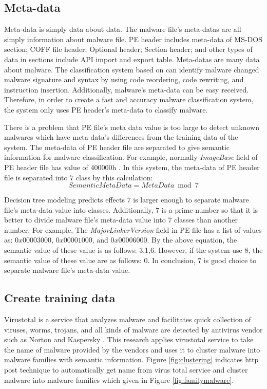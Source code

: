 \subsection{Meta-data}
Meta-data is simply data about data. The malware file's meta-datas are all simply information about malware file. PE header includes meta-data of MS-DOS section; COFF file header; Optional header; Section header; and other types of data in sections include API import and export table. Meta-datas are many data about malware. The classification system based on can identify malware changed malware signature and syntax by using code reordering, code rewriting, and instruction insertion. Additionally, malware's meta-data can be easy received. 
Therefore, in order to create a fast and accuracy malware classification system, the system only uses PE header's meta-data to classify malware.
 
There is a problem that PE file's meta data value is too large to detect unknown malwares which have meta-data's differences from the training data of the system. The meta-data of PE header file are separated  to give semantic information for malware classification. For example, normally \emph{ImageBase} field of PE header file has value of 400000h \cite{goppit}. In this system, the meta-data of PE header file is separated into $7$ class by this calculation:
\begin{equation}
SemanticMetaData = MetaData \bmod 7
\end{equation} 

Decision tree modeling predicts effects $7$ is larger enough to separate malware file's meta-data value into classes. Additionally, $7$ is a prime number so that it is better to divide malware file's meta-data value into $7$ classes than another number. For example, The \emph{MajorLinkerVersion} field in PE file has a list of values as: $0x00003000$, $0x00001000$, and $0x00006000$. By the above equation, the semantic value of these value is as follows: 3,1,6. However, if the system use $8$, the semantic value of these value are as follows: 0. In conclusion, $7$ is good choice to separate malware file's meta-data value.

\subsection{Create training data}
Virustotal is a service that analyzes malware and facilitates quick collection of viruses, worms, trojans, and all kinds of malware are detected by antivirus vendor such as Norton and Kaspersky \cite{virustotal}. This research applies virustotal service to take the name of malware provided by the vendors and uses it to cluster malware into malware families with semantic information. 
Figure \ref{fig:clustering} indicates http post technique to automatically get name from virus total service and cluster malware into malware families which given in Figure \ref{fig:familymalware}.

